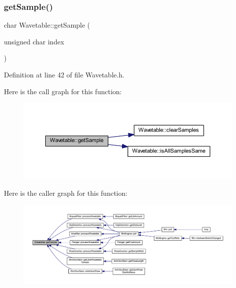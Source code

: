 \subsubsection{\texorpdfstring{get\+Sample()}{getSample()}}
{\footnotesize\ttfamily char Wavetable\+::get\+Sample (\begin{DoxyParamCaption}\item[{unsigned char}]{index }\end{DoxyParamCaption})\hspace{0.3cm}{\ttfamily [inline]}}



Definition at line 42 of file Wavetable.\+h.

Here is the call graph for this function\+:
\nopagebreak
\begin{figure}[H]
\begin{center}
\leavevmode
\includegraphics[width=350pt]{d8/d3f/class_wavetable_a2ed27fd46eac11bd828c7111fca7bc0b_cgraph}
\end{center}
\end{figure}
Here is the caller graph for this function\+:
\nopagebreak
\begin{figure}[H]
\begin{center}
\leavevmode
\includegraphics[width=350pt]{d8/d3f/class_wavetable_a2ed27fd46eac11bd828c7111fca7bc0b_icgraph}
\end{center}
\end{figure}
\mbox{\label{class_wavetable_ac7f597021cdace95c4e1e4c88fc36d2a}} 
